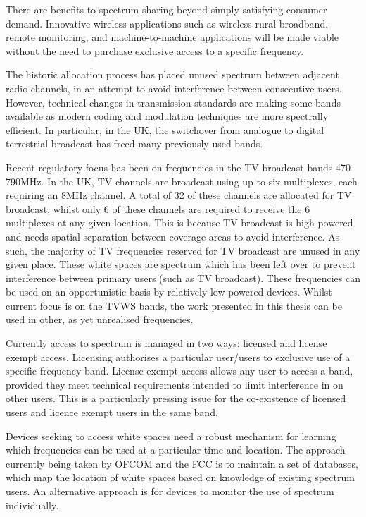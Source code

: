 \documentclass{article}
\begin{document}
There are benefits to spectrum sharing beyond simply satisfying consumer demand. Innovative wireless applications such as wireless rural broadband, remote monitoring, and machine-to-machine applications will be made viable without the need to purchase exclusive access to a specific frequency. 

The historic allocation process has placed unused spectrum between adjacent radio channels, in an attempt to avoid interference between consecutive users. However, technical changes in transmission standards are making some bands available as modern coding and modulation techniques are more spectrally efficient. In particular, in the UK, the switchover from analogue to digital terrestrial broadcast has freed many previously used bands.

Recent regulatory focus has been on frequencies in the TV broadcast bands 470-790MHz. In the UK, TV channels are broadcast using up to six multiplexes, each requiring an 8MHz channel. A total of 32 of these channels are allocated for TV broadcast, whilst only 6 of these channels are required to receive the 6 multiplexes at any given location. This is because TV broadcast is high powered and needs spatial separation between coverage areas to avoid interference. As such, the majority of TV frequencies reserved for TV broadcast are unused in any given place. These white spaces are spectrum which has been left over to prevent interference between primary users (such as TV broadcast). These frequencies can be used on an opportunistic basis by relatively low-powered devices. Whilst current focus is on the TVWS bands, the work presented in this thesis can be used in other, as yet unrealised frequencies.

Currently access to spectrum is managed in two ways: licensed and license exempt access. Licensing authorises a particular user/users to exclusive use of a specific frequency band. License exempt access allows any user to access a band, provided they meet technical requirements intended to limit interference in on other users. This is a particularly pressing issue for the co-existence of licensed users and licence exempt users in the same band.

Devices seeking to access white spaces need a robust mechanism for learning which frequencies can be used at a particular time and location. The approach currently being taken by OFCOM and the FCC is to maintain a set of databases, which map the location of white spaces based on knowledge of existing spectrum users. An alternative approach is for devices to monitor the use of spectrum individually.
\end{document}
